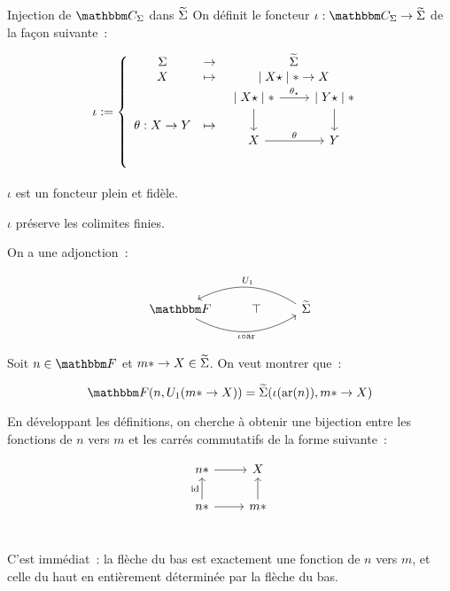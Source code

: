 \begin{defi}{Injection de $\C_\Sigma$ dans $\widetilde{\Sigma}$}
    On définit le foncteur $\iota:\C_\Sigma\rightarrow\tsigma$ de la façon suivante~:

    \[ \iota := \left\{\begin{array}{ccc}
        \Sigma & \rightarrow & \tsigma \\
        X      & \mapsto     & \mid X\star\mid\ast\rightarrow X \\
        \theta : X\rightarrow Y & \mapsto &
            \begin{tikzcd}
                \mid X\star\mid\ast\arrow[d]
                                   \arrow[r, "\theta_\star"]
                    & \mid Y\star\mid\ast\arrow[d] \\
                X\arrow[r, "\theta"]
                    & Y \\
            \end{tikzcd} \\
    \end{array}\right. \]
\end{defi}

\begin{lem}
    $\iota$ est un foncteur plein et fidèle.
\end{lem}

\begin{cor}
    $\iota$ préserve les colimites finies.
\end{cor}

\begin{lem}
    On a une adjonction~:

    \[\begin{tikzcd}
        \cf\arrow[rr, bend right, swap, "\iota\circ\arf"] & \top
            & \tsigma\arrow[ll, bend right, swap, "U_1"] \\
    \end{tikzcd}\]
\end{lem}

\begin{pv}
    Soit $n\in\cf$ et $m\ast\rightarrow X\in\widetilde{\Sigma}$. On veut montrer que~:

    \[\cf(n, U_1(m\ast\rightarrow X)) = \tsigma(\iota(\arf(n)), m\ast\rightarrow X)\]

    En développant les définitions, on cherche à obtenir une bijection entre
    les fonctions de $n$ vers $m$ et les carrés commutatifs de la forme suivante~:

    \[\begin{tikzcd}
        n\ast\arrow[r] & X \\
        n\ast\arrow[u, "\id"]\arrow[r] & m\ast\arrow[u] \\
    \end{tikzcd}\]

    C'est immédiat~: la flèche du bas est exactement une fonction de $n$ vers $m$,
    et celle du haut en entièrement déterminée par la flèche du bas.
\end{pv}


